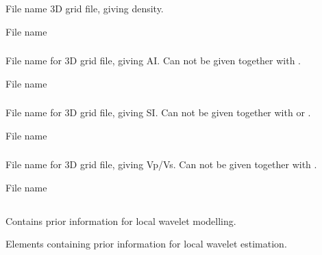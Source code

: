 \subsubsection{}
 \slist
   \item \Description File name 3D grid file, giving density.
   \item \Argument File name
   \item \Default
 \elist

\subsubsection{}
 \slist
   \item \Description File name for 3D grid file, giving AI. Can not
     be given together with  .
   \item \Argument File name
   \item \Default
 \elist

\subsubsection{}
 \slist
   \item \Description File name for 3D grid file, giving SI. Can not
   be given together with  or .
   \item \Argument File name
   \item \Default
 \elist

\subsubsection{}
 \slist
   \item \Description File name for 3D grid file, giving Vp/Vs. Can
   not be given together with .
   \item \Argument File name
   \item \Default
 \elist

\subsection{}
 \slist
   \item \Description Contains prior information for local wavelet modelling.
   \item \Argument Elements containing prior information for local wavelet estimation.
   \item \Default
 \elist

